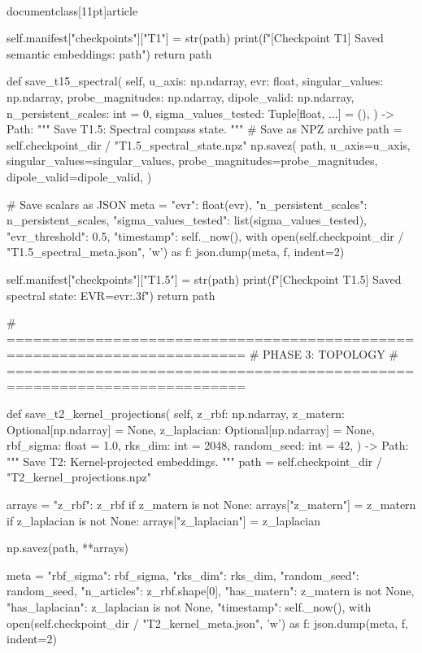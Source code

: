 \\documentclass[11pt]{article}
\begin{document}
\begin{CodeBlock}
        self.manifest["checkpoints"]["T1"] = str(path)
        print(f"[Checkpoint T1] Saved semantic embeddings: {path}")
        return path

    def save_t15_spectral(
        self,
        u_axis: np.ndarray,
        evr: float,
        singular_values: np.ndarray,
        probe_magnitudes: np.ndarray,
        dipole_valid: np.ndarray,
        n_persistent_scales: int = 0,
        sigma_values_tested: Tuple[float, ...] = (),
    ) -> Path:
        """
        Save T1.5: Spectral compass state.
        """
        # Save as NPZ archive
        path = self.checkpoint_dir / "T1.5_spectral_state.npz"
        np.savez(
            path,
            u_axis=u_axis,
            singular_values=singular_values,
            probe_magnitudes=probe_magnitudes,
            dipole_valid=dipole_valid,
        )

        # Save scalars as JSON
        meta = {
            "evr": float(evr),
            "n_persistent_scales": n_persistent_scales,
            "sigma_values_tested": list(sigma_values_tested),
            "evr_threshold": 0.5,
            "timestamp": self._now(),
        }
        with open(self.checkpoint_dir / "T1.5_spectral_meta.json", 'w') as f:
            json.dump(meta, f, indent=2)

        self.manifest["checkpoints"]["T1.5"] = str(path)
        print(f"[Checkpoint T1.5] Saved spectral state: EVR={evr:.3f}")
        return path

    # =========================================================================
    # PHASE 3: TOPOLOGY
    # =========================================================================

    def save_t2_kernel_projections(
        self,
        z_rbf: np.ndarray,
        z_matern: Optional[np.ndarray] = None,
        z_laplacian: Optional[np.ndarray] = None,
        rbf_sigma: float = 1.0,
        rks_dim: int = 2048,
        random_seed: int = 42,
    ) -> Path:
        """
        Save T2: Kernel-projected embeddings.
        """
        path = self.checkpoint_dir / "T2_kernel_projections.npz"

        arrays = {"z_rbf": z_rbf}
        if z_matern is not None:
            arrays["z_matern"] = z_matern
        if z_laplacian is not None:
            arrays["z_laplacian"] = z_laplacian

        np.savez(path, **arrays)

        meta = {
            "rbf_sigma": rbf_sigma,
            "rks_dim": rks_dim,
            "random_seed": random_seed,
            "n_articles": z_rbf.shape[0],
            "has_matern": z_matern is not None,
            "has_laplacian": z_laplacian is not None,
            "timestamp": self._now(),
        }
        with open(self.checkpoint_dir / "T2_kernel_meta.json", 'w') as f:
            json.dump(meta, f, indent=2)


\end{CodeBlock}
\end{document}
